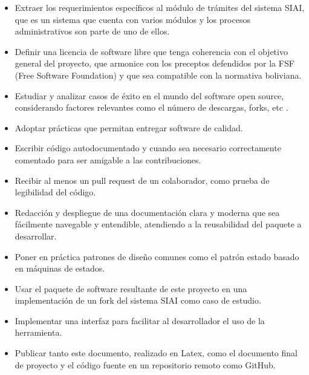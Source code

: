 \begin{itemize}
	\item Extraer los requerimientos específicos al módulo de trámites del
	      sistema SIAI, que es un sistema que cuenta con varios módulos y los
	      procesos administrativos son parte de uno de ellos.

	\item Definir una licencia de software libre que tenga coherencia con el
	      objetivo general del proyecto, que armonice con los preceptos defendidos
	      por la FSF (Free Software Foundation) y que sea compatible con la
	      normativa boliviana.

	\item Estudiar y analizar casos de éxito en el mundo del software open
	      source, considerando factores relevantes como el número de descargas,
	      forks, etc \cite{mujahidWhatAreCharacteristics2023}.

	\item Adoptar prácticas que permitan entregar software de calidad.

	\item Escribir código autodocumentado y cuando sea necesario correctamente
	      comentado para ser amigable a las contribuciones.

	\item Recibir al menos un pull request de un colaborador, como prueba de
	      legibilidad del código.

	\item Redacción y despliegue de una documentación clara y moderna que sea
	      fácilmente navegable y entendible, atendiendo a la reusabilidad del
	      paquete a desarrollar.

	\item Poner en práctica patrones de diseño comunes como el patrón estado
	      basado en máquinas de estados.

	\item Usar el paquete de software resultante de este proyecto en una
	      implementación de un fork del sistema SIAI como caso de estudio.

	\item Implementar una interfaz para facilitar al desarrollador el uso de la
	      herramienta.

	\item Publicar tanto este documento, realizado en Latex, como el documento
	      final de proyecto y el código fuente en un repositorio remoto como
	      GitHub.


\end{itemize}
